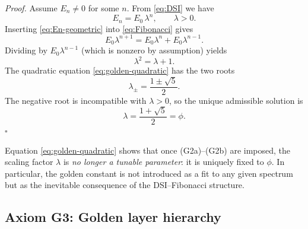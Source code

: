 \documentclass[10pt,reprint,aps,onecolumn,nofootinbib]{revtex4-2}
\begin{document}
        \medskip
        \noindent\emph{Proof.}
        Assume $E_n\neq 0$ for some $n$. From \eqref{eq:DSI} we have
        \begin{equation}
            E_n = E_0\,\lambda^{n},
            \qquad
            \lambda>0.
            \label{eq:En-geometric}
        \end{equation}
        Inserting \eqref{eq:En-geometric} into \eqref{eq:Fibonacci} gives
        \begin{equation}
            E_0\lambda^{n+1}
            = E_0\lambda^n + E_0\lambda^{n-1}.
        \end{equation}
        Dividing by $E_0\lambda^{n-1}$ (which is nonzero by assumption) yields
        \begin{equation}
            \lambda^{2} = \lambda + 1.
            \label{eq:golden-quadratic}
        \end{equation}
        The quadratic equation \eqref{eq:golden-quadratic} has the two roots
        \begin{equation}
            \lambda_{\pm} = \frac{1\pm\sqrt{5}}{2}.
        \end{equation}
        The negative root is incompatible with $\lambda>0$, so the unique
        admissible solution is
        \begin{equation}
            \lambda = \frac{1+\sqrt{5}}{2} = \phi.
        \end{equation}
        \hfill$\square$

        \medskip

        Equation \eqref{eq:golden-quadratic} shows that once (G2a)--(G2b) are
        imposed, the scaling factor $\lambda$ is \emph{no longer a tunable
    parameter}: it is uniquely fixed to $\phi$. In particular, the golden
        constant is not introduced as a fit to any given spectrum but as the
        inevitable consequence of the DSI--Fibonacci structure.

    \subsection{Axiom G3: Golden layer hierarchy}
\end{document}
